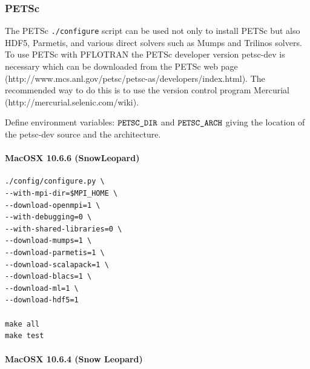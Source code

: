 \documentclass[12pt]{article}
\begin{document}
\subsubsection{PETSc}

The PETSc {\tt ./configure} script can be used not only to install PETSc but also HDF5, Parmetis, and various direct solvers such as Mumps and Trilinos solvers. To use PETSc with PFLOTRAN the PETSc developer version petsc-dev is necessary which can be downloaded from the PETSc web page (http://www.mcs.anl.gov/petsc/petsc-as/developers/index.html). The recommended way to do this is to use the version control program Mercurial \linebreak (http://mercurial.selenic.com/wiki).

Define environment variables: $\verb|PETSC_DIR|$ and $\verb|PETSC_ARCH|$ giving the location of the petsc-dev source and the architecture.

\paragraph{MacOSX 10.6.6 (SnowLeopard)}

\begin{verbatim}
./config/configure.py \
--with-mpi-dir=$MPI_HOME \
--download-openmpi=1 \
--with-debugging=0 \
--with-shared-libraries=0 \
--download-mumps=1 \
--download-parmetis=1 \
--download-scalapack=1 \
--download-blacs=1 \
--download-ml=1 \
--download-hdf5=1 

make all
make test
\end{verbatim}

\paragraph{MacOSX 10.6.4 (Snow Leopard)}
\end{document}

